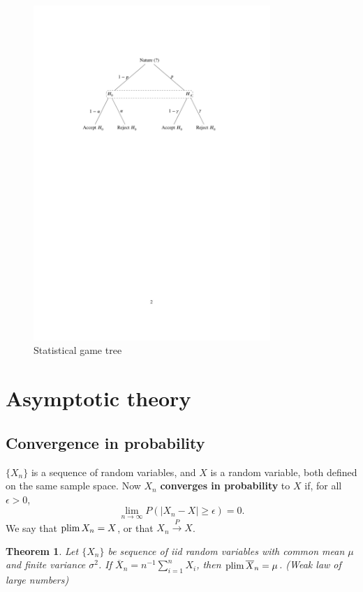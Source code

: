 \documentclass[10pt]{article}
\newtheorem{theorem}{Theorem}%
\begin{document}
\begin{figure}[tb]
  \begin{center}
\includegraphics[width=0.8\textwidth]{../graphs/B.pdf}
  \end{center}
\caption{Statistical game tree}\label{fig:B}
\end{figure}


\section{Asymptotic theory}\label{sec:asymptotics}

\subsection{Convergence in probability}

$\{X_n\}$ is a sequence of random variables, and $X$ is a random variable, both
defined on the same sample space. Now $X_n$ \textbf{converges in probability} to $X$
if, for all $\epsilon>0$,
\[\lim_{n\rightarrow\infty} P( |X_n-X|\geq \epsilon) = 0.\] We say that
$\operatorname{plim} X_n = X$, or that $X_n \xrightarrow{P} X$.

\begin{theorem}
Let $\{X_n\}$ be sequence of iid random variables with common mean $\mu$ and
finite variance $\sigma^2$. If $\overline{X}_n = n^{-1}\sum_{i=1}^n X_i$, then
$\operatorname{plim} \overline{X}_n=\mu$. (Weak law of large numbers)
\end{theorem}
\end{document}
